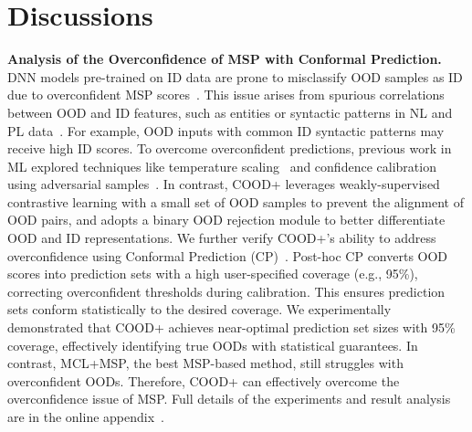 
\section{Discussions}\label{sec:discussions}

\textbf{Analysis of the Overconfidence of MSP with Conformal Prediction.} DNN models pre-trained on ID data are prone to misclassify OOD samples as ID due to overconfident MSP scores~\cite{lee2017training, liang2017enhancing}. This issue arises from spurious correlations between OOD and ID features, such as entities or syntactic patterns in NL and PL data~\cite{zheng2020aug, wu2022revisit}. For example, OOD inputs with common ID syntactic patterns may receive high ID scores. To overcome overconfident predictions, previous work in ML explored techniques like temperature scaling~\cite{liang2017enhancing} and  confidence calibration using adversarial samples~\cite{lee2017training, bitterwolf2020certifiably}. In contrast, COOD+ leverages weakly-supervised contrastive learning with a small set of OOD samples to prevent the alignment of OOD pairs, and adopts a binary OOD rejection module to better differentiate OOD and ID representations. We further verify COOD+'s ability to address overconfidence using Conformal Prediction (CP)~\cite{angelopoulos2023conformal}. Post-hoc CP converts OOD scores into prediction sets with a high user-specified coverage (e.g., 95\%), correcting overconfident thresholds during calibration. This ensures prediction sets conform statistically to the desired coverage. We experimentally demonstrated that COOD+ achieves near-optimal prediction set sizes with 95\% coverage, effectively identifying true OODs with statistical guarantees. In contrast, MCL+MSP, the best MSP-based method, still struggles with overconfident OODs.  Therefore, COOD+ can effectively overcome the overconfidence issue of MSP. Full details of the experiments and result analysis are in the online appendix~\cite{cood-tool}.


